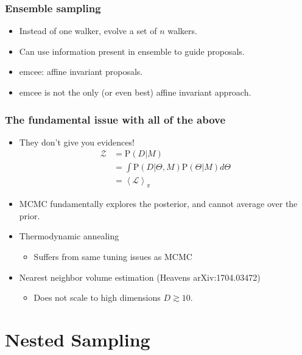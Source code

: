 \documentclass[%
]{beamer}
\newcommand{\lik}{\mathcal{L}}
\newcommand{\prior}{\pi}
\newcommand{\ev}{\mathcal{Z}}
\newcommand{\prob}{\mathrm{P}}
\begin{document}
\begin{frame}
  \frametitle{Ensemble sampling} 
  \begin{itemize}
      \item Instead of one walker, evolve a set of $n$ walkers.
      \item Can use information present in ensemble to guide proposals.
      \item emcee: affine invariant proposals.
      \item emcee is not the only (or even best) affine invariant approach.
  \end{itemize}
\end{frame}

\begin{frame}
  \frametitle{The fundamental issue with all of the above} 

  \begin{itemize}
    \item They don't give you evidences!
  \begin{align}
    \ev 
    &= \prob(D|M) 
    \nonumber\\
    &= \int\prob(D|\Theta,M)\prob(\Theta|M) d\Theta 
    \nonumber\\
    &= \left\langle \lik \right\rangle_\prior
    \nonumber
  \end{align}
    \item MCMC fundamentally explores the posterior, and cannot average over the prior.
    \item Thermodynamic annealing 
    \begin{itemize}
        \item Suffers from same tuning issues as MCMC
    \end{itemize}
    \item Nearest neighbor volume estimation (Heavens arXiv:1704.03472)
    \begin{itemize}
        \item Does not scale to high dimensions $D\gtrsim10$.
    \end{itemize}
  \end{itemize}
 
\end{frame}

\section{Nested Sampling}
\end{document}
